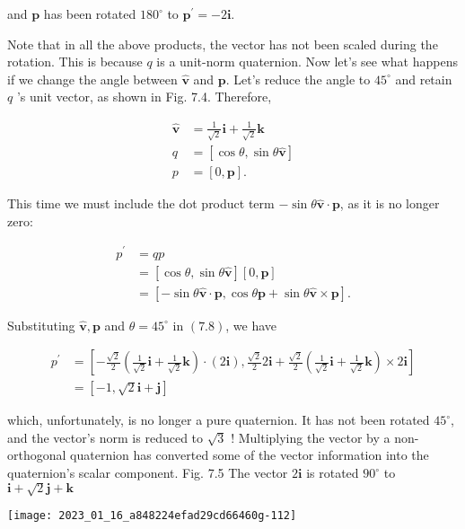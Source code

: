 and $\mathbf{p}$ has been rotated $180^{\circ}$ to $\mathbf{p}^{\prime}=-2 \mathbf{i}$.

Note that in all the above products, the vector has not been scaled during the rotation. This is because $q$ is a unit-norm quaternion. Now let's see what happens if we change the angle between $\hat{\mathbf{v}}$ and $\mathbf{p}$. Let's reduce the angle to $45^{\circ}$ and retain $q$ 's unit vector, as shown in Fig. 7.4. Therefore,

$$
\begin{aligned}
\hat{\mathbf{v}} & =\frac{1}{\sqrt{2}} \mathbf{i}+\frac{1}{\sqrt{2}} \mathbf{k} \\
q & =[\cos \theta, \sin \theta \hat{\mathbf{v}}] \\
p & =[0, \mathbf{p}] .
\end{aligned}
$$

This time we must include the dot product term $-\sin \theta \hat{\mathbf{v}} \cdot \mathbf{p}$, as it is no longer zero:

$$
\begin{aligned}
p^{\prime} & =q p \\
& =[\cos \theta, \sin \theta \hat{\mathbf{v}}][0, \mathbf{p}] \\
& =[-\sin \theta \hat{\mathbf{v}} \cdot \mathbf{p}, \cos \theta \mathbf{p}+\sin \theta \hat{\mathbf{v}} \times \mathbf{p}] .
\end{aligned}
$$

Substituting $\hat{\mathbf{v}}, \mathbf{p}$ and $\theta=45^{\circ}$ in $(7.8)$, we have

$$
\begin{aligned}
p^{\prime} & =\left[-\frac{\sqrt{2}}{2}\left(\frac{1}{\sqrt{2}} \mathbf{i}+\frac{1}{\sqrt{2}} \mathbf{k}\right) \cdot(2 \mathbf{i}), \frac{\sqrt{2}}{2} 2 \mathbf{i}+\frac{\sqrt{2}}{2}\left(\frac{1}{\sqrt{2}} \mathbf{i}+\frac{1}{\sqrt{2}} \mathbf{k}\right) \times 2 \mathbf{i}\right] \\
& =[-1, \sqrt{2} \mathbf{i}+\mathbf{j}]
\end{aligned}
$$

which, unfortunately, is no longer a pure quaternion. It has not been rotated $45^{\circ}$, and the vector's norm is reduced to $\sqrt{3}$ ! Multiplying the vector by a non-orthogonal quaternion has converted some of the vector information into the quaternion's scalar component. Fig. 7.5 The vector $2 \mathbf{i}$ is rotated $90^{\circ}$ to $\mathbf{i}+\sqrt{2} \mathbf{j}+\mathbf{k}$

\begin{center}
\texttt{[image: 2023\_01\_16\_a848224efad29cd66460g-112]}
\end{center}

